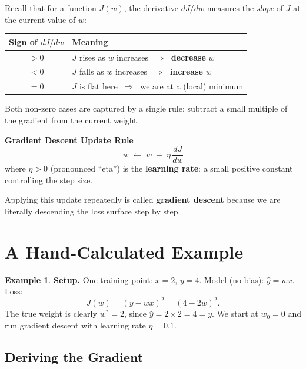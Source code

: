 \documentclass[12pt, a4paper]{article}
\theoremstyle{definition}
\newtheorem{example}{Example}[section]
\newcommand{\yhat}{\hat{y}}
\begin{document}
Recall that for a function $J(w)$, the derivative $dJ/dw$ measures the
\emph{slope} of $J$ at the current value of $w$:

\begin{center}
\renewcommand{\arraystretch}{1.3}
\begin{tabular}{cl}
\toprule
Sign of $dJ/dw$ & Meaning \\
\midrule
$> 0$ & $J$ rises as $w$ increases $\;\Rightarrow\;$ \textbf{decrease} $w$ \\
$< 0$ & $J$ falls as $w$ increases $\;\Rightarrow\;$ \textbf{increase} $w$ \\
$= 0$ & $J$ is flat here $\;\Rightarrow\;$ we are at a (local) minimum \\
\bottomrule
\end{tabular}
\end{center}

Both non-zero cases are captured by a single rule: subtract a small multiple
of the gradient from the current weight.

\begin{resultbox}
\textbf{Gradient Descent Update Rule}
\[
  w \;\longleftarrow\; w \;-\; \eta\,\frac{dJ}{dw}
\]
where $\eta > 0$ (pronounced ``eta'') is the \textbf{learning rate}: a small
positive constant controlling the step size.
\end{resultbox}

Applying this update repeatedly is called \textbf{gradient descent} because
we are literally descending the loss surface step by step.

\section{A Hand-Calculated Example}

\begin{example}
\textbf{Setup.}
One training point: $x = 2$, $y = 4$.
Model (no bias): $\yhat = wx$.
Loss:
\[
  J(w) = (y - wx)^2 = (4 - 2w)^2.
\]
The true weight is clearly $w^{*} = 2$, since $\yhat = 2 \times 2 = 4 = y$.
We start at $w_0 = 0$ and run gradient descent with learning rate
$\eta = 0.1$.
\end{example}

\subsection{Deriving the Gradient}
\end{document}
